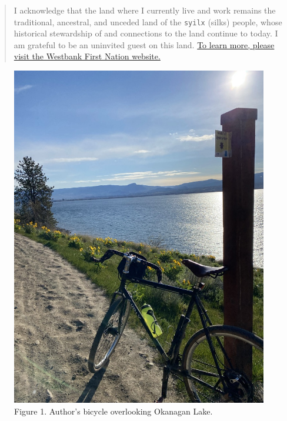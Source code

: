\documentclass[
]{book}
\begin{document}
\begin{quote}
I acknowledge that the land where I currently live and work remains the traditional, ancestral, and unceded land of the \texttt{syilx} (silks) people, whose historical stewardship of and connections to the land continue to today. I am grateful to be an uninvited guest on this land. \href{https://wfn.ca}{To learn more, please visit the Westbank First Nation website.}
\end{quote}

\begin{figure}
\centering
\includegraphics{assets/otessa22/kalamoir.jpg}
\caption{Figure 1. Author's bicycle overlooking Okanagan Lake.}
\end{figure}

  
\end{document}
